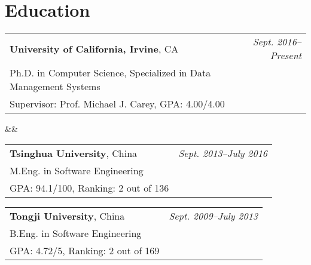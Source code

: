 \documentclass[11pt,a4paper,roman]{moderncv}        %
\makeatletter
\newcommand{\zap}[1]{ }
\newcommand{\reduce}{\vspace{-0.115in}}
\renewcommand*{\cventry}[7][1em]{
  \begin{tabular*}{\maincolumnwidth}{l@{\extracolsep{\fill}}r}%
    {#3} & {\small\itshape#2}\\%
    {#4} & \\
    {#6} & \\
  \end{tabular*}%
  \ifx&#7&%
  \else{\\%
    \begin{minipage}{\maincolumnwidth}%
      #7%
    \end{minipage}}\fi%
  \par\addvspace{#1}}
\newcommand*{\cvschool}[6][1em]{
	\begin{tabular*}{\maincolumnwidth}{l@{\extracolsep{\fill}}r}%
		{#3} & {\small\itshape#2}\\%
		{#4} & \\
		{#6} & \\
	\end{tabular*}%
	\par\addvspace{#1}}
\makeatother
\begin{document}
\makecvtitle

\zap{
\reduce
\section{Objective}
\vspace{-0.05in}
To obtain a software engineering internship specializing in Data Management Systems
}

\reduce
\section{Education}
\vspace{-0.05in}
\cventry{Sept. 2016--Present}{\textbf{University of California, Irvine}, CA}{Ph.D. in Computer 
Science, Specialized in Data Management Systems}{}{Supervisor: Prof. Michael J. Carey, GPA: 4.00/4.00}{}
\vspace{-0.15in}
\cvschool{Sept. 2013--July 2016}{\textbf{Tsinghua University}, China}{M.Eng. in Software 
Engineering}{}{GPA: 94.1/100, Ranking: 2 out of 136}
\vspace{-0.15in}
\cvschool{Sept. 2009--July 2013}{\textbf{Tongji University}, China}{B.Eng. in Software Engineering}{}{GPA: 4.72/5, Ranking: 2 out of 169}
\reduce

\reduce
\end{document}
